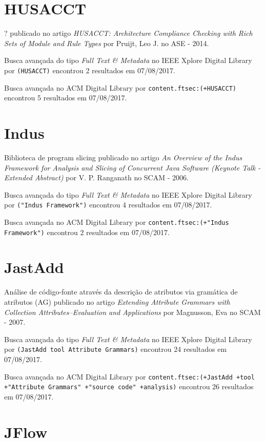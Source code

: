\section{HUSACCT}

?
publicado no artigo
{\it HUSACCT: Architecture Compliance Checking with Rich Sets of Module and Rule Types}
por
Pruijt, Leo J.
no
ASE
-
2014.

Busca avançada do tipo {\it Full Text \& Metadata} no IEEE Xplore Digital Library por
\texttt{(HUSACCT)}
encontrou
2 resultados em
07/08/2017.

Busca avançada no ACM Digital Library por
\texttt{content.ftsec:(+HUSACCT)}
encontrou
5 resultados em
07/08/2017.

\section{Indus}

Biblioteca de program slicing
publicado no artigo
{\it An Overview of the Indus Framework for Analysis and Slicing of Concurrent Java Software (Keynote Talk - Extended Abstract)}
por
V. P. Ranganath
no
SCAM
-
2006.

Busca avançada do tipo {\it Full Text \& Metadata} no IEEE Xplore Digital Library por
\texttt{("Indus Framework")}
encontrou
4 resultados em
07/08/2017.

Busca avançada no ACM Digital Library por
\texttt{content.ftsec:(+"Indus Framework")}
encontrou
2 resultados em
07/08/2017.

\section{JastAdd}

Análise de código-fonte através da descrição de atributos via gramática de atributos (AG)
publicado no artigo
{\it Extending Attribute Grammars with Collection Attributes--Evaluation and Applications}
por
Magnusson, Eva
no
SCAM
-
2007.

Busca avançada do tipo {\it Full Text \& Metadata} no IEEE Xplore Digital Library por
\texttt{(JastAdd tool Attribute Grammars)}
encontrou
24 resultados em
07/08/2017.

Busca avançada no ACM Digital Library por
\texttt{content.ftsec:(+JastAdd +tool +"Attribute Grammars" +"source code" +analysis)}
encontrou
26 resultados em
07/08/2017.

\section{JFlow}

